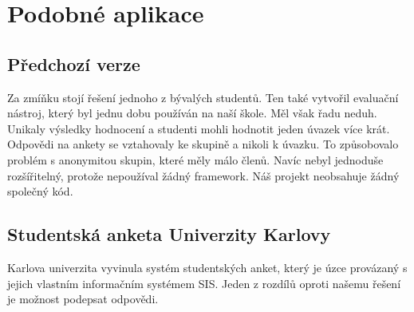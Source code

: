 \section{Podobné aplikace}
\subsection{Předchozí verze}\label{uvod:predchozi-verze}
Za zmíňku stojí řešení jednoho z bývalých studentů.
Ten také vytvořil evaluační nástroj, který byl jednu dobu používán na naší škole.
Měl však řadu neduh.
Unikaly výsledky hodnocení a studenti mohli hodnotit jeden úvazek více krát. Odpovědi na ankety se vztahovaly ke skupině a nikoli k úvazku. To způsobovalo problém s anonymitou skupin, které měly málo členů.  Navíc nebyl jednoduše rozšířitelný, protože nepoužíval žádný framework. Náš projekt neobsahuje žádný společný kód.
\subsection{Studentská anketa Univerzity Karlovy}
Karlova univerzita vyvinula systém studentských anket, který je úzce provázaný s jejich vlastním informačním systémem SIS.  Jeden z rozdílů oproti našemu řešení je možnost podepsat odpovědi.\cite{matfyz-anketa}
